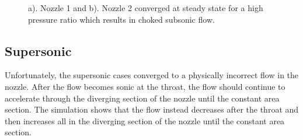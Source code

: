\documentclass{article}%
\numberwithin{equation}{section}
\begin{document}
\pagebreak

\begin{figure}[h!]
\caption{a). Nozzle 1 and b). Nozzle 2 converged at steady state for a high pressure ratio which results in choked subsonic flow. \label{chokesubsonic}}
\end{figure}


\subsection{Supersonic}
Unfortunately, the supersonic cases converged to a physically incorrect flow in the nozzle. After the flow becomes sonic at the throat, the flow should continue to accelerate through the diverging section of the nozzle until the constant area section. The simulation shows that the flow instead decreases after the throat and then increases all in the diverging section of the nozzle until the constant area section.
\end{document}
